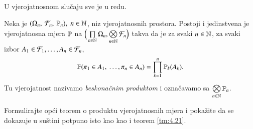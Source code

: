 U vjerojatnosnom slu\v caju sve je u redu.

\begin{tm}  \label{tm:4.21}
    Neka je $(\Omega_n, \: \mathcal{F}_n, \: \mathbb{P}_n), \; n \in \mathbb{N}$, niz vjerojatnosnih prostora.
    Postoji i jedinstvena je vjerojatnosna mjera $\mathbb{P}$ na $\Big( \prod\limits_{n \in \mathbb{N}}^{} \Omega_n, \bigotimes\limits_{n \in \mathbb{N}}^{} \mathcal{F}_n \Big)$ takva da je za svaki $n \in \mathbb{N}$, za svaki izbor $A_1 \in \mathcal{F}_1, \dots, A_n \in \mathcal{F}_n$,
    \begin{equation*}
        \mathbb{P}(\pi_1 \in A_1, \: \dots, \pi_n \in A_n)
        = \prod\limits_{k = 1}^{n} \mathbb{P}_k (A_k).
    \end{equation*}
    Tu vjerojatnost nazivamo \emph{beskona\v cnim produktom} i ozna\v cavamo sa $\bigotimes\limits_{n \in \mathbb{N}}^{} \mathbb{P}_n$.
\end{tm}

\begin{zad} \label{zad:4.22}
    Formulirajte op\' ci teorem o produktu vjerojatnosnih mjera i poka\v zite da se dokazuje u su\v stini potpuno isto kao kao i teorem \ref{tm:4.21}.
\end{zad}